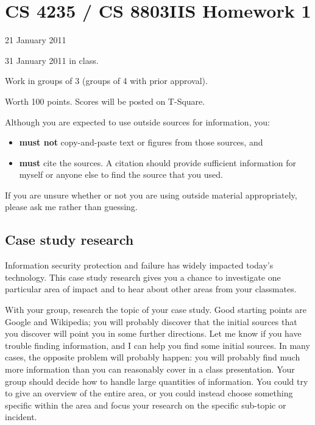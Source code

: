 \documentclass[letterpaper]{article}
\title{}
\date{}
\begin{document}
\thispagestyle{empty}

\section*{CS 4235 / CS 8803IIS Homework 1}

 21 January 2011

 31 January 2011 in class.

 Work in groups of 3 (groups of 4 with prior approval).

 Worth 100 points. Scores will be posted on T-Square.

\bigskip\noindent
Although you are expected to use outside sources for information, you:
\begin{itemize}
\item {\bf must not} copy-and-paste text or figures from those sources, and
\item {\bf must} cite the sources. A citation should provide sufficient information for myself or anyone else to find the source that you used.
\end{itemize}
If you are unsure whether or not you are using outside material appropriately, please ask me rather than guessing.

\subsection*{Case study research}

Information security protection and failure has widely impacted today's technology. This case study research gives you a chance to investigate one particular area of impact and to hear about other areas from your classmates. 

With your group, research the topic of your case study. Good starting points are Google and Wikipedia; you will probably discover that the initial sources that you discover will point you in some further directions. Let me know if you have trouble finding information, and I can help you find some initial sources. In many cases, the opposite problem will probably happen: you will probably find much more information than you can reasonably cover in a class presentation. Your group should decide how to handle large quantities of information. You could try to give an overview of the entire area, or you could instead choose something specific within the area and focus your research on the specific sub-topic or incident.
\end{document}
